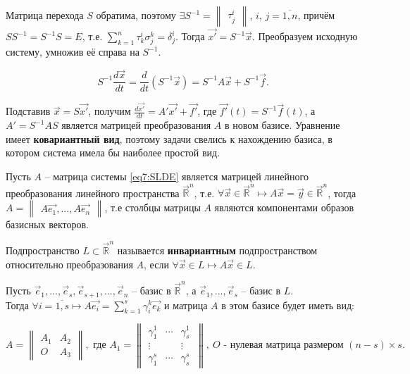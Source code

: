 Матрица перехода $S$ обратима, поэтому $\exists S^{-1} = \begin{Vmatrix} \tau_j^i \end{Vmatrix}$, $i,\,j = \overline{1, n}$, причём $SS^{-1} = S^{-1}S = E$, 
т.е. $\sum \limits_{k = 1}^n \tau_k^i \sigma_j^k = \delta_j^i$. Тогда $\overrightarrow{x'} = S^{-1}\overrightarrow{x}$.
Преобразуем исходную систему, умножив её справа на $S^{-1}$.

\[ S^{-1} \frac{d\overrightarrow{x}}{dt} = \frac{d}{dt} (S^{-1}\overrightarrow{x}) = S^{-1}A\overrightarrow{x} + S^{-1}\overrightarrow{f}.\]

Подставив $\overrightarrow x = S \overrightarrow{x'}$, получим $\frac{d\overrightarrow{x'}}{dt} = A' \overrightarrow{x'} + \overrightarrow{f'}$, где $\overrightarrow{f'}(t) = S^{-1}\overrightarrow{f}(t)$, 
а $A' = S^{-1}AS$ является матрицей преобразования $A$ в новом базисе. Уравнение имеет \textbf{ковариантный вид}, поэтому задачи свелись к нахождению базиса, в котором система имела бы наиболее простой вид.

Пусть $A$ -- матрица системы \eqref{eq7:SLDE} является матрицей линейного преобразования линейного пространства $\overrightarrow{\mathbb{R}}^n$, 
т.е. $\forall \overrightarrow{x} \in \overrightarrow{\mathbb{R}}^n \mapsto A\overrightarrow{x} = \overrightarrow{y} \in \overrightarrow{\mathbb{R}}^n$, тогда $A = \begin{Vmatrix} A\overrightarrow{e_1}, ..., A\overrightarrow{e_n} \end{Vmatrix}$, 
т.е столбцы матрицы $A$ являются компонентами образов базисных векторов.

\begin{definition}
    Подпространство $L \subset \overrightarrow{\mathbb{R}}^n$ называется \textbf{инвариантным} подпространством относительно преобразования $A$, если $\forall \overrightarrow{x} \in L \mapsto A \overrightarrow{x} \in L$.
\end{definition}

Пусть $\overrightarrow{e}_1, ..., \overrightarrow{e}_s, \overrightarrow{e}_{s+1}, ..., \overrightarrow{e}_n$ -- базис в $\overrightarrow{\mathbb{R}}^n$, а $\overrightarrow{e}_1, ..., \overrightarrow{e}_s$ -- базис в $L$. \\
Тогда $\forall i = \overline{1, s} \mapsto A\overrightarrow{e_i} = \sum\limits_{k=1}^s \gamma_i^k \overrightarrow{e_k}$ и матрица $A$ в этом базисе будет иметь вид:

\[ A = \begin{Vmatrix} A_1 & A_2 \\ O & A_3 \end{Vmatrix}, \text{ где } A_1 = \begin{Vmatrix} \gamma_1^1 & \cdots & \gamma_s^1 \\ \vdots & & \vdots \\ \gamma_1^s &\cdots & \gamma_s^s\ \end{Vmatrix}, ~O \text{ - нулевая матрица размером } (n - s) \times s. \]


